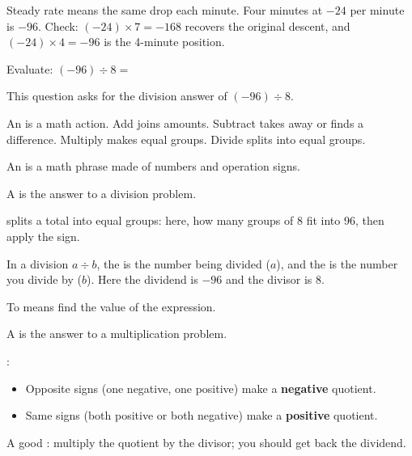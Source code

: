 
\noindent Steady rate means the same drop each minute. Four minutes at $-24$ per minute is $-96$. Check: $(-24) \times 7 = -168$ recovers the original descent, and $(-24) \times 4 = -96$ is the 4-minute position.


\noindent Evaluate: $(-96) \div 8 =$


\noindent This question asks for the division answer of $(-96) \div 8$.

\begin{words}
  \item An is a math action. Add joins amounts. Subtract takes away or finds a difference. Multiply makes equal groups. Divide splits into equal groups.
  \item An is a math phrase made of numbers and operation signs.
  \item A is the answer to a division problem.
  \item {}splits a total into equal groups: here, how many groups of 8 fit into 96, then apply the sign.
  \item In a division $a \div b$, the is the number being divided ($a$), and the is the number you divide by ($b$). Here the dividend is $-96$ and the divisor is 8.
  \item To means find the value of the expression.
  \item A is the answer to a multiplication problem.
  \item {}:
    \begin{itemize}[leftmargin=1.8em,label=--,topsep=0.25\baselineskip,itemsep=0.25\baselineskip]
      \item Opposite signs (one negative, one positive) make a \textbf{negative} quotient.
      \item Same signs (both positive or both negative) make a \textbf{positive} quotient.
    \end{itemize}
  \item A good : multiply the quotient by the divisor; you should get back the dividend.
\end{words}

